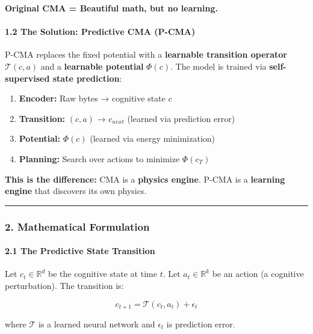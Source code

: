 \documentclass[
  11pt,
  a4paper,
]{article}
\providecommand{\tightlist}{%
  \setlength{\itemsep}{0pt}\setlength{\parskip}{0pt}}
\begin{document}
\textbf{Original CMA = Beautiful math, but no learning.}

\paragraph{1.2 The Solution: Predictive CMA
(P-CMA)}\label{the-solution-predictive-cma-p-cma}

P-CMA replaces the fixed potential with a \textbf{learnable transition
operator} \(\mathcal{T}(c, a)\) and a \textbf{learnable potential}
\(\Phi(c)\). The model is trained via \textbf{self-supervised state
prediction}:

\begin{enumerate}
\def\labelenumi{\arabic{enumi}.}
\tightlist
\item
  \textbf{Encoder:} Raw bytes → cognitive state \(c\)
\item
  \textbf{Transition:} \((c, a)\) → \(c_{next}\) (learned via prediction
  error)
\item
  \textbf{Potential:} \(\Phi(c)\) (learned via energy minimization)
\item
  \textbf{Planning:} Search over actions to minimize \(\Phi(c_T)\)
\end{enumerate}

\textbf{This is the difference:} CMA is a \textbf{physics engine}. P-CMA
is a \textbf{learning engine} that discovers its own physics.

\begin{center}\rule{0.5\linewidth}{0.5pt}\end{center}

\subsubsection{2. Mathematical
Formulation}\label{mathematical-formulation}

\paragraph{2.1 The Predictive State
Transition}\label{the-predictive-state-transition}

Let \(c_t \in \mathbb{R}^d\) be the cognitive state at time \(t\). Let
\(a_t \in \mathbb{R}^k\) be an action (a cognitive perturbation). The
transition is:

\[c_{t+1} = \mathcal{T}(c_t, a_t) + \epsilon_t\]

where \(\mathcal{T}\) is a learned neural network and \(\epsilon_t\) is
prediction error.
\end{document}
